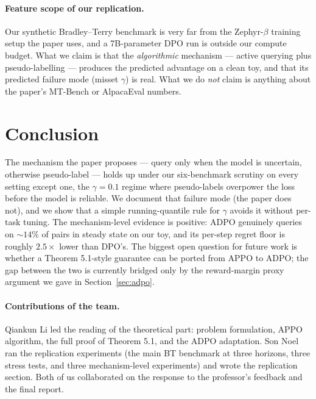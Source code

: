 \documentclass[11pt]{article}
\begin{document}
\paragraph{Feature scope of our replication.}
Our synthetic Bradley--Terry benchmark is very far from the Zephyr-$\beta$ training setup the paper uses, and a 7B-parameter DPO run is outside our compute budget. What we claim is that the \emph{algorithmic} mechanism --- active querying plus pseudo-labelling --- produces the predicted advantage on a clean toy, and that its predicted failure mode (misset $\gamma$) is real. What we do \emph{not} claim is anything about the paper's MT-Bench or AlpacaEval numbers.

\section{Conclusion}

The mechanism the paper proposes --- query only when the model is uncertain, otherwise pseudo-label --- holds up under our six-benchmark scrutiny on every setting except one, the $\gamma = 0.1$ regime where pseudo-labels overpower the loss before the model is reliable. We document that failure mode (the paper does not), and we show that a simple running-quantile rule for $\gamma$ avoids it without per-task tuning. The mechanism-level evidence is positive: ADPO genuinely queries on $\sim 14\%$ of pairs in steady state on our toy, and its per-step regret floor is roughly $2.5\times$ lower than DPO's. The biggest open question for future work is whether a Theorem 5.1-style guarantee can be ported from APPO to ADPO; the gap between the two is currently bridged only by the reward-margin proxy argument we gave in Section~\ref{sec:adpo}.

\paragraph{Contributions of the team.}
Qiankun Li led the reading of the theoretical part: problem formulation, APPO algorithm, the full proof of Theorem 5.1, and the ADPO adaptation. Son Noel ran the replication experiments (the main BT benchmark at three horizons, three stress tests, and three mechanism-level experiments) and wrote the replication section. Both of us collaborated on the response to the professor's feedback and the final report.
\end{document}

